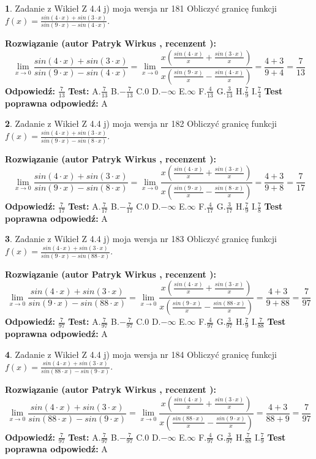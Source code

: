\documentclass[12pt, a4paper]{article}
\theoremstyle{definition} %
\newtheorem{zad}{}
\newcommand{\zadStart}[1]{\begin{zad}#1\newline}
\newcommand{\zadStop}{\end{zad}}
\newcommand{\rozwStart}[2]{\noindent \textbf{Rozwiązanie (autor #1 , recenzent #2): }\newline}
\newcommand{\rozwStop}{\newline}
\newcommand{\odpStart}{\noindent \textbf{Odpowiedź:}\newline}
\newcommand{\odpStop}{\newline}
\newcommand{\testStart}{\noindent \textbf{Test:}\newline}
\newcommand{\testStop}{\newline}
\newcommand{\kluczStart}{\noindent \textbf{Test poprawna odpowiedź:}\newline}
\newcommand{\kluczStop}{\newline}
\begin{document}
\zadStart{Zadanie z Wikieł Z 4.4 j) moja wersja nr 181}
Obliczyć granicę funkcji $f(x)=\frac{sin(4\cdot x) +sin(3\cdot x)}{sin(9\cdot x) -sin(4\cdot x)}$.
\zadStop
\rozwStart{Patryk Wirkus}{}
$$\lim\limits_{x\to 0}\frac{sin(4\cdot x) +sin(3\cdot x)}{sin(9\cdot x) -sin(4\cdot x)}=\lim\limits_{x\to 0}\frac{x(\frac{sin(4\cdot x)}{x}+\frac{sin(3\cdot x)}{x})}{x(\frac{sin(9\cdot x)}{x}-\frac{sin(4\cdot x)}{x})}=\frac{4+3}{9+4} = \frac{7}{13}$$
\rozwStop
\odpStart
$\frac{7}{13}$
\odpStop
\testStart
A.$\frac{7}{13}$
B.$-\frac{7}{13}$
C.$0$
D.$-\infty$
E.$\infty$
F.$\frac{4}{13}$
G.$\frac{3}{13}$
H.$\frac{7}{9}$
I.$\frac{7}{4}$
\testStop
\kluczStart
A
\kluczStop



\zadStart{Zadanie z Wikieł Z 4.4 j) moja wersja nr 182}
Obliczyć granicę funkcji $f(x)=\frac{sin(4\cdot x) +sin(3\cdot x)}{sin(9\cdot x) -sin(8\cdot x)}$.
\zadStop
\rozwStart{Patryk Wirkus}{}
$$\lim\limits_{x\to 0}\frac{sin(4\cdot x) +sin(3\cdot x)}{sin(9\cdot x) -sin(8\cdot x)}=\lim\limits_{x\to 0}\frac{x(\frac{sin(4\cdot x)}{x}+\frac{sin(3\cdot x)}{x})}{x(\frac{sin(9\cdot x)}{x}-\frac{sin(8\cdot x)}{x})}=\frac{4+3}{9+8} = \frac{7}{17}$$
\rozwStop
\odpStart
$\frac{7}{17}$
\odpStop
\testStart
A.$\frac{7}{17}$
B.$-\frac{7}{17}$
C.$0$
D.$-\infty$
E.$\infty$
F.$\frac{4}{17}$
G.$\frac{3}{17}$
H.$\frac{7}{9}$
I.$\frac{7}{8}$
\testStop
\kluczStart
A
\kluczStop



\zadStart{Zadanie z Wikieł Z 4.4 j) moja wersja nr 183}
Obliczyć granicę funkcji $f(x)=\frac{sin(4\cdot x) +sin(3\cdot x)}{sin(9\cdot x) -sin(88\cdot x)}$.
\zadStop
\rozwStart{Patryk Wirkus}{}
$$\lim\limits_{x\to 0}\frac{sin(4\cdot x) +sin(3\cdot x)}{sin(9\cdot x) -sin(88\cdot x)}=\lim\limits_{x\to 0}\frac{x(\frac{sin(4\cdot x)}{x}+\frac{sin(3\cdot x)}{x})}{x(\frac{sin(9\cdot x)}{x}-\frac{sin(88\cdot x)}{x})}=\frac{4+3}{9+88} = \frac{7}{97}$$
\rozwStop
\odpStart
$\frac{7}{97}$
\odpStop
\testStart
A.$\frac{7}{97}$
B.$-\frac{7}{97}$
C.$0$
D.$-\infty$
E.$\infty$
F.$\frac{4}{97}$
G.$\frac{3}{97}$
H.$\frac{7}{9}$
I.$\frac{7}{88}$
\testStop
\kluczStart
A
\kluczStop



\zadStart{Zadanie z Wikieł Z 4.4 j) moja wersja nr 184}
Obliczyć granicę funkcji $f(x)=\frac{sin(4\cdot x) +sin(3\cdot x)}{sin(88\cdot x) -sin(9\cdot x)}$.
\zadStop
\rozwStart{Patryk Wirkus}{}
$$\lim\limits_{x\to 0}\frac{sin(4\cdot x) +sin(3\cdot x)}{sin(88\cdot x) -sin(9\cdot x)}=\lim\limits_{x\to 0}\frac{x(\frac{sin(4\cdot x)}{x}+\frac{sin(3\cdot x)}{x})}{x(\frac{sin(88\cdot x)}{x}-\frac{sin(9\cdot x)}{x})}=\frac{4+3}{88+9} = \frac{7}{97}$$
\rozwStop
\odpStart
$\frac{7}{97}$
\odpStop
\testStart
A.$\frac{7}{97}$
B.$-\frac{7}{97}$
C.$0$
D.$-\infty$
E.$\infty$
F.$\frac{4}{97}$
G.$\frac{3}{97}$
H.$\frac{7}{88}$
I.$\frac{7}{9}$
\testStop
\kluczStart
A
\kluczStop
\end{document}
